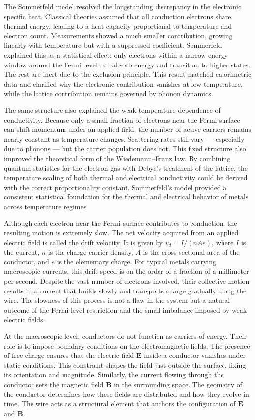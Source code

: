 The Sommerfeld model resolved the longstanding discrepancy in the electronic specific heat. Classical theories assumed that all conduction electrons share thermal energy, leading to a heat capacity proportional to temperature and electron count. Measurements showed a much smaller contribution, growing linearly with temperature but with a suppressed coefficient. Sommerfeld explained this as a statistical effect: only electrons within a narrow energy window around the Fermi level can absorb energy and transition to higher states. The rest are inert due to the exclusion principle. This result matched calorimetric data and clarified why the electronic contribution vanishes at low temperature, while the lattice contribution remains governed by phonon dynamics.

The same structure also explained the weak temperature dependence of conductivity. Because only a small fraction of electrons near the Fermi surface can shift momentum under an applied field, the number of active carriers remains nearly constant as temperature changes. Scattering rates still vary — especially due to phonons — but the carrier population does not. This fixed structure also improved the theoretical form of the Wiedemann–Franz law. By combining quantum statistics for the electron gas with Debye's treatment of the lattice, the temperature scaling of both thermal and electrical conductivity could be derived with the correct proportionality constant. Sommerfeld's model provided a consistent statistical foundation for the thermal and electrical behavior of metals across temperature regimes

Although each electron near the Fermi surface contributes to conduction, the resulting motion is extremely slow. The net velocity acquired from an applied electric field is called the drift velocity. It is given by $v_d = I / (n A e)$, where $I$ is the current, $n$ is the charge carrier density, $A$ is the cross-sectional area of the conductor, and $e$ is the elementary charge. For typical metals carrying macroscopic currents, this drift speed is on the order of a fraction of a millimeter per second. Despite the vast number of electrons involved, their collective motion results in a current that builds slowly and transports charge gradually along the wire. The slowness of this process is not a flaw in the system but a natural outcome of the Fermi-level restriction and the small imbalance imposed by weak electric fields.

At the macroscopic level, conductors do not function as carriers of energy. Their role is to impose boundary conditions on the electromagnetic fields. The presence of free charge ensures that the electric field $\mathbf{E}$ inside a conductor vanishes under static conditions. This constraint shapes the field just outside the surface, fixing its orientation and magnitude. Similarly, the current flowing through the conductor sets the magnetic field $\mathbf{B}$ in the surrounding space. The geometry of the conductor determines how these fields are distributed and how they evolve in time. The wire acts as a structural element that anchors the configuration of $\mathbf{E}$ and $\mathbf{B}$.

